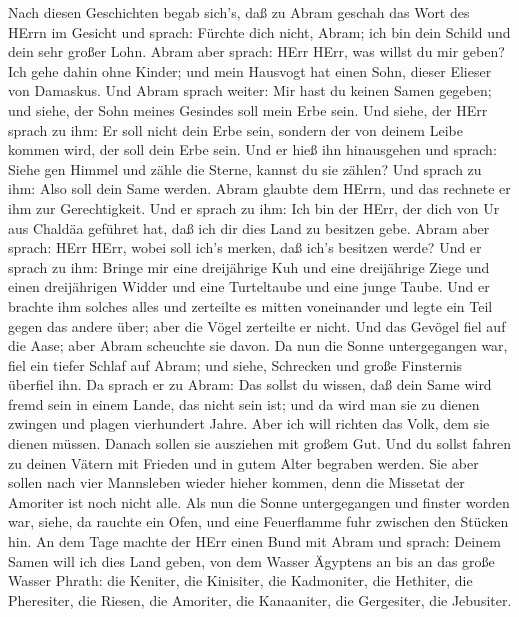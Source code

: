  Nach diesen Geschichten begab sich's, daß zu Abram geschah
das Wort des HErrn im Gesicht und sprach: Fürchte dich nicht, Abram; ich
bin dein Schild und dein sehr großer Lohn.  Abram aber
sprach: HErr HErr, was willst du mir geben? Ich gehe dahin ohne Kinder;
und mein Hausvogt hat einen Sohn, dieser Elieser von Damaskus.
 Und Abram sprach weiter: Mir hast du keinen Samen gegeben;
und siehe, der Sohn meines Gesindes soll mein Erbe sein. 
Und siehe, der HErr sprach zu ihm: Er soll nicht dein Erbe sein, sondern
der von deinem Leibe kommen wird, der soll dein Erbe sein. 
Und er hieß ihn hinausgehen und sprach: Siehe gen Himmel und zähle die
Sterne, kannst du sie zählen? Und sprach zu ihm: Also soll dein Same
werden.  Abram glaubte dem HErrn, und das rechnete er ihm
zur Gerechtigkeit.  Und er sprach zu ihm: Ich bin der HErr,
der dich von Ur aus Chaldäa geführet hat, daß ich dir dies Land zu
besitzen gebe.  Abram aber sprach: HErr HErr, wobei soll
ich's merken, daß ich's besitzen werde?  Und er sprach zu
ihm: Bringe mir eine dreijährige Kuh und eine dreijährige Ziege und
einen dreijährigen Widder und eine Turteltaube und eine junge Taube.
 Und er brachte ihm solches alles und zerteilte es mitten
voneinander und legte ein Teil gegen das andere über; aber die Vögel
zerteilte er nicht.  Und das Gevögel fiel auf die Aase;
aber Abram scheuchte sie davon.  Da nun die Sonne
untergegangen war, fiel ein tiefer Schlaf auf Abram; und siehe,
Schrecken und große Finsternis überfiel ihn.  Da sprach er
zu Abram: Das sollst du wissen, daß dein Same wird fremd sein in einem
Lande, das nicht sein ist; und da wird man sie zu dienen zwingen und
plagen vierhundert Jahre.  Aber ich will richten das Volk,
dem sie dienen müssen. Danach sollen sie ausziehen mit großem Gut.
 Und du sollst fahren zu deinen Vätern mit Frieden und in
gutem Alter begraben werden.  Sie aber sollen nach vier
Mannsleben wieder hieher kommen, denn die Missetat der Amoriter ist noch
nicht alle.  Als nun die Sonne untergegangen und finster
worden war, siehe, da rauchte ein Ofen, und eine Feuerflamme fuhr
zwischen den Stücken hin.  An dem Tage machte der HErr
einen Bund mit Abram und sprach: Deinem Samen will ich dies Land geben,
von dem Wasser Ägyptens an bis an das große Wasser Phrath: 
die Keniter, die Kinisiter, die Kadmoniter,  die Hethiter,
die Pheresiter, die Riesen,  die Amoriter, die Kanaaniter,
die Gergesiter, die Jebusiter.

